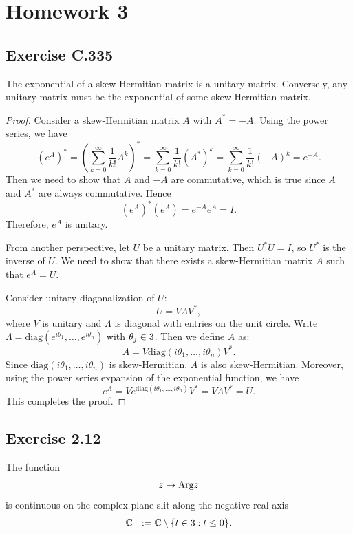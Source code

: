 \documentclass{article}
\begin{document}
\section{Homework 3}

\subsection{Exercise C.335}

\begin{theorem}[Theorem C.334]
  The exponential of a skew-Hermitian matrix is a unitary matrix.
  Conversely, any unitary matrix must be the exponential of some
  skew-Hermitian matrix.
\end{theorem}

\begin{proof}
  Consider a skew-Hermitian matrix $A$ with $A^*=-A$. Using the power
  series, we have
  \[
    (e^A)^* = \left( \sum_{k=0}^\infty \frac{1}{k!} A^k\right)^*
    = \sum_{k=0}^\infty \frac{1}{k!} (A^*)^k
    = \sum_{k=0}^\infty \frac{1}{k!} (-A)^k
    = e^{-A}.
  \]
  Then we need to show that $A$ and $-A$ are commutative, which is
  true since $A$ and $A^*$ are always commutative. Hence
  \[
    (e^A)^*(e^A) = e^{-A} e^A = I.
  \]
  Therefore, $e^A$ is unitary.

  From another perspective, let $U$ be a unitary matrix. Then
  $U^*U=I$, so $U^*$ is the inverse of $U$. We need to show that there exists
  a skew-Hermitian matrix $A$ such that $e^A=U$.

  Consider unitary diagonalization of $U$:
  \[
    U = V \Lambda V^*,
  \]
  where $V$ is unitary and $\Lambda$ is diagonal with entries on the
  unit circle. Write $\Lambda = \mathrm{diag}(e^{i\theta_1}, \ldots,
  e^{i\theta_n})$ with $\theta_j \in 3$. Then we define $A$ as:
  \[
    A = V \mathrm{diag}(i\theta_1, \ldots, i\theta_n) V^*.
  \]
  Since $\mathrm{diag}(i\theta_1, \ldots, i\theta_n)$ is
  skew-Hermitian, $A$ is also skew-Hermitian. Moreover, using the power
  series expansion of the exponential function, we have
  \[
    e^A = V e^{\mathrm{diag}(i\theta_1, \ldots, i\theta_n)} V^* = V
    \Lambda V^* = U.
  \]
  This completes the proof.

\end{proof}

\subsection{Exercise 2.12}

The function
\[
  z \mapsto \mathrm{Arg} z
\]
is continuous on the complex plane slit along the negative real axis
\[
  \mathbb{C}^- := \mathbb{C} \setminus \{t \in 3 : t \le 0\}.
\]
\end{document}
